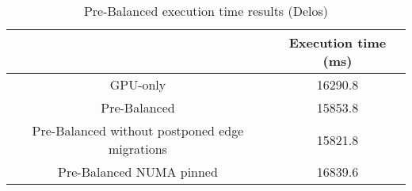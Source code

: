 \begin{table}[H]
  \centering
  \begin{tabular}{||c | c||} 
   \hline
    & Execution time (ms) \\ [0.5ex] 
   \hline\hline
   GPU-only & 16290.8 \\
   Pre-Balanced & 15853.8 \\ 
   Pre-Balanced without postponed edge migrations & 15821.8 \\
   Pre-Balanced NUMA pinned & 16839.6 \\ [1ex] 
   \hline
  \end{tabular}
  \caption{Pre-Balanced execution time results (Delos)}
  \label{table:preb_delos}
\end{table}